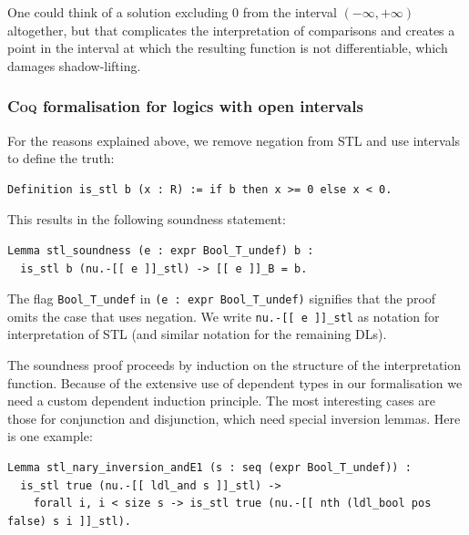 \documentclass[a4paper,UKenglish,cleveref, autoref, thm-restate]{lipics-v2021}
\def\coqin#1{\texttt{#1}}
\def\STL{\textrm{STL}}
\def\coq{\textsc{Coq}}
\begin{document}
One could think of a solution excluding $0$ from the interval $(-\infty, +\infty)$ altogether, but that 
complicates the interpretation of comparisons and creates a point in the interval 
at which the resulting function is not differentiable, which damages shadow-lifting.

\subsubsection*{\coq{} formalisation for logics with open intervals}

For the reasons explained above, we remove negation from \STL{} and use intervals to
define the truth:
\begin{verbatim}
Definition is_stl b (x : R) := if b then x >= 0 else x < 0.
\end{verbatim}
This results in the following soundness statement:
\begin{verbatim}
Lemma stl_soundness (e : expr Bool_T_undef) b :
  is_stl b (nu.-[[ e ]]_stl) -> [[ e ]]_B = b.
\end{verbatim}
The flag \coqin{Bool_T_undef} in \coqin{(e : expr Bool_T_undef)} signifies that
the proof omits the case that uses negation.
%
We write \coqin{nu.-[[ e ]]_stl} as notation for interpretation of
\STL{} (and similar notation for the remaining DLs).

The soundness proof proceeds by induction on the structure of the
interpretation function.  Because of the extensive use of dependent
types in our formalisation we need a custom dependent induction
principle.
%
The most interesting cases are those for conjunction and disjunction,
which need special inversion lemmas.  Here is one example:
\begin{verbatim}
Lemma stl_nary_inversion_andE1 (s : seq (expr Bool_T_undef)) :
  is_stl true (nu.-[[ ldl_and s ]]_stl) ->
    forall i, i < size s -> is_stl true (nu.-[[ nth (ldl_bool pos false) s i ]]_stl).
\end{verbatim}
\end{document}
